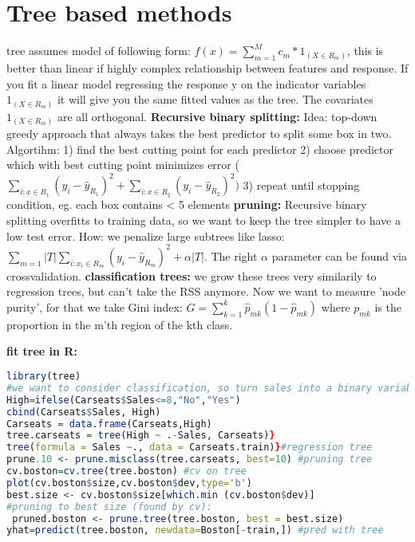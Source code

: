 \section{Tree based methods}
tree assumes model of following form: 
$f(x) = \sum_{m=1}^M c_m*1_{(X \in R_m)}$, this is better than linear if highly complex relationship between features and response. If you fit a linear model regressing the response y on the indicator variables $1_{(X \in R_m)}$ it will give you the same fitted values as the tree. The covariates $1_{(X \in R_m)}$ are all orthogonal.
\textbf{Recursive binary splitting: }
Idea: top-down greedy approach that always takes the best predictor to split some box in two. Algortihm:
1) find the best cutting point for each predictor
2) choose predictor which with best cutting point minimizes error ($\sum_{i:x \in R_1}(y_i-\hat y_{R_1})^2+\sum_{i:x \in R_2}(y_i-\hat y_{R_2})^2)$
3) repeat until stopping condition, eg. each box contains < 5 elements
\textbf{pruning: } Recursive binary splitting overfitts to training data, so we want to keep the tree simpler to have a low test error. How: we penalize large subtrees like lasso: $\sum_{m=1}{|T|}\sum_{i: x_i \in R_m}(y_i - \hat y_{R_m})^2 + \alpha|T|$. The right $\alpha$ parameter can be found via crossvalidation. 
\textbf{classification trees: } we grow these trees very similarily to regression trees, but can't take the RSS anymore. Now we want to measure 'node purity', for that we take Gini index: $G = \sum_{k=1}^k \hat p_{mk}(1-\hat p_{mk})$ where $p_{mk}$ is the proportion in the m'th region of the kth class.

\textbf{fit tree in R:}\begin{lstlisting}[language=R] library(tree)
#we want to consider classification, so turn sales into a binary variable
High=ifelse(Carseats$Sales<=8,"No","Yes")
cbind(Carseats$Sales, High)
Carseats = data.frame(Carseats,High)
tree.carseats = tree(High ~ .-Sales, Carseats)}
tree(formula = Sales ~., data = Carseats.train)}#regression tree
prune.10 <- prune.misclass(tree.carseats, best=10) #pruning tree
cv.boston=cv.tree(tree.boston) #cv on tree
plot(cv.boston$size,cv.boston$dev,type='b')
best.size <- cv.boston$size[which.min (cv.boston$dev)]
#pruning to best size (found by cv): 
 pruned.boston <- prune.tree(tree.boston, best = best.size)
yhat=predict(tree.boston, newdata=Boston[-train,]) #pred with tree \end{lstlisting}